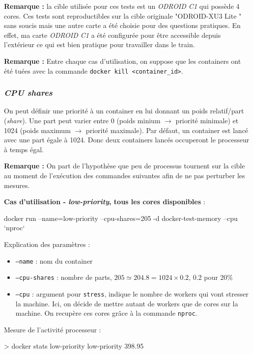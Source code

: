\documentclass[11pt,a4paper,oneside]{report}
\newcommand{\code}[1]{\texttt{#1}}
\newcommand{\odroid}{ODROID-XU3 Lite }
\begin{document}
\textbf{Remarque :} la cible utilisée pour ces tests est un \textit{ODROID C1} qui possède 4 cores. Ces tests sont reproductibles sur la cible originale "\odroid" sans soucis mais une autre carte a été choisie pour des questions pratiques. En effet, ma carte \textit{ODROID C1} a été configurée pour être accessible depuis l'extérieur ce qui est bien pratique pour travailler dans le train.

\textbf{Remarque :} Entre chaque cas d'utilisation, on suppose que les containers ont été tuées avec la commande \code{docker kill <container\_id>}.


\subsubsection{\textit{CPU shares}}
On peut définir une priorité à un container en lui donnant un poids relatif/part (\textit{share}). Une part peut varier entre 0 (poids minium $\to$ priorité minimale) et 1024 (poids maximum $\to$ priorité maximale). Par défaut, un container est lancé avec une part égale à 1024. Donc deux containers lancés occuperont le processeur à temps égal.


\textbf{Remarque :} On part de l'hypothèse que peu de processus tournent sur la cible au moment de l'exécution des commandes suivantes afin de ne pas perturber les mesures.

\textbf{Cas d'utilisation - \textit{low-priority}, tous les cores disponibles} : 
\begin{textcode}
docker run --name=low-priority --cpu-shares=205 -d docker-test-memory --cpu `nproc`
\end{textcode}

Explication des paramètres :
\begin{itemize}
\item \code{--name} : nom du container
\item \code{--cpu-shares} : nombre de parts, $205 \simeq 204.8 = 1024 \times 0.2$, 0.2 pour 20\%
\item \code{--cpu} : argument pour \code{stress}, indique le nombre de workers qui vont stresser la machine. Ici, on décide de mettre autant de workers que de cores sur la machine. On recupère ces cores grâce à la commande \code{nproc}.
\end{itemize}

Mesure de l'activité processeur :
\begin{bashcode}
> docker stats low-priority
low-priority   398.95%
\end{bashcode}
\end{document}
